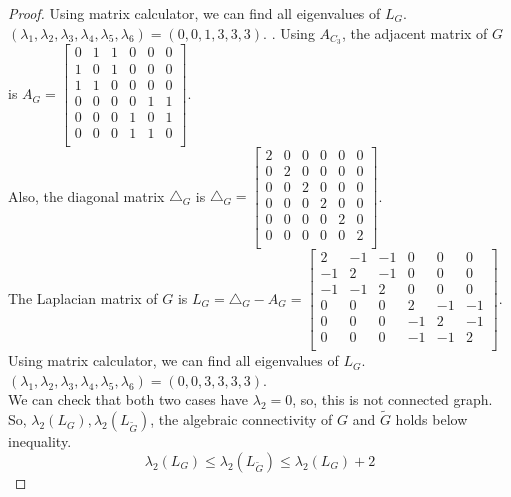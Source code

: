 \documentclass[a4paper, 12pt]{article}
\begin{document}
\begin{proof}
Using matrix calculator, we can find all eigenvalues of $L_G$.\\
$(\lambda_1,\lambda_2,\lambda_3,\lambda_4,\lambda_5,\lambda_6) = (0, 0, 1, 3, 3, 3)$.
. Using $A_{C_3}$, the adjacent matrix of $G$ is $A_G = \begin{bmatrix}0&1&1&0&0&0\\1&0&1&0&0&0\\1&1&0&0&0&0\\0&0&0&0&1&1\\0&0&0&1&0&1\\0&0&0&1&1&0\\ \end{bmatrix}$.\\
Also, the diagonal matrix $\triangle _G$ is $\triangle _G = \begin{bmatrix}2&0&0&0&0&0\\0&2&0&0&0&0\\0&0&2&0&0&0\\0&0&0&2&0&0\\0&0&0&0&2&0\\0&0&0&0&0&2\\ \end{bmatrix}$.\\
The Laplacian matrix of $G$ is $L_G = \triangle _G - A_G = \begin{bmatrix}2&-1&-1&0&0&0\\-1&2&-1&0&0&0\\-1&-1&2&0&0&0\\0&0&0&2&-1&-1\\0&0&0&-1&2&-1\\0&0&0&-1&-1&2\\ \end{bmatrix}$.\\
Using matrix calculator, we can find all eigenvalues of $L_G$.\\
$(\lambda_1,\lambda_2,\lambda_3,\lambda_4,\lambda_5,\lambda_6) = (0, 0, 3, 3, 3, 3)$.\\
We can check that both two cases have $\lambda_2 = 0$, so, this is not connected graph. So, $\lambda_2 ( L_G), \lambda _2 ( L_{\tilde{G}} )$, the algebraic connectivity of $G$ and $\tilde{G}$ holds below inequality.\\
$$\lambda_2(L_G) \leq \lambda_2(L_{\tilde{G}}) \leq \lambda_2(L_G) + 2$$
\end{proof}
\end{document}
